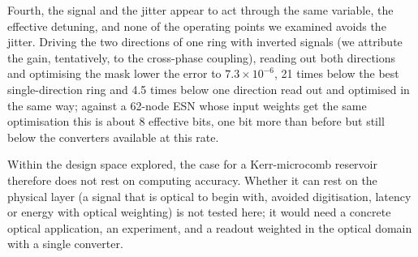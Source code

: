 Fourth, the signal and the jitter appear to act through the same variable, the effective detuning, and none of the operating points
we examined avoids the jitter. Driving the two directions of one ring with inverted signals (we attribute the gain, tentatively, to the
cross-phase coupling), reading out both directions and optimising the mask lower the error to $7.3\times10^{-6}$, 21 times below the
best single-direction ring and 4.5 times below one direction read out and optimised in the same way; against a 62-node ESN whose input weights get the same
optimisation this is about 8 effective bits, one bit more than before but still below the converters available at this rate.

Within the design space explored, the case for a Kerr-microcomb reservoir therefore does not rest on computing accuracy. Whether it can
rest on the physical layer (a signal that is optical to begin with, avoided digitisation, latency or energy with optical weighting) is
not tested here; it would need a concrete optical application, an experiment, and a readout weighted in the optical domain with a
single converter.
